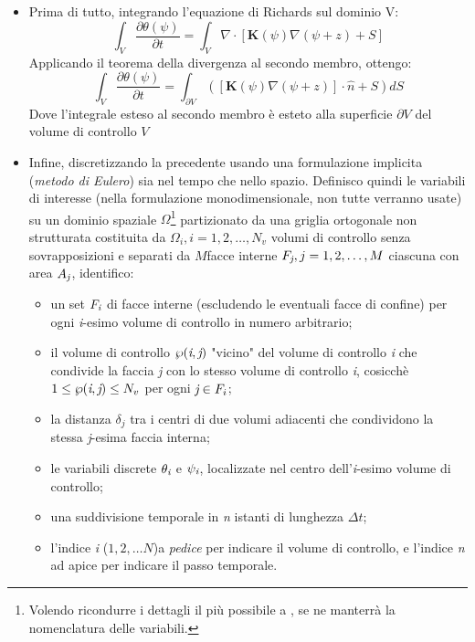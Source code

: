 \documentclass[11pt]{amsart}
\theoremstyle{definition}
\theoremstyle{remark}
\numberwithin{equation}{section}
\begin{document}
\begin{itemize}
  \item Prima di tutto, integrando l'equazione di Richards sul dominio V:
  \begin{equation}
  \int_{V}\frac{\partial \theta(\psi)}{\partial t} = \int_{V}\nabla\cdot[\textbf{K}(\psi)\nabla(\psi+z) + S]
  \end{equation}
  Applicando il teorema della divergenza al secondo membro, ottengo:
  \begin{equation}
  \int_{V}\frac{\partial \theta(\psi)}{\partial t} = \int_{\partial V}([\textbf{K}(\psi)\nabla(\psi+z)]\cdot \hat{n} + S)dS
  \end{equation}
  Dove l'integrale esteso al secondo membro è esteto alla superficie $\partial V$ del volume di controllo $V$
  \item Infine, discretizzando la precedente usando una formulazione implicita (\emph{metodo di Eulero}) sia nel tempo che nello spazio. Definisco quindi le variabili di interesse (nella formulazione monodimensionale, non tutte verranno usate) su un dominio spaziale $\Omega$\footnote{Volendo ricondurre i dettagli il più possibile a \cite{art:casulli}, se ne manterrà la nomenclatura delle variabili.} partizionato da una griglia ortogonale non strutturata costituita da $\Omega_i, i=1,2,\dots,N_{v}$ volumi di controllo senza sovrapposizioni e separati da $M$facce interne $F_{\emph{j}}, j = 1,2,\dots,M$ ciascuna con area $A_{\emph{j}}$, identifico:
    \begin{itemize}
    \item un set $F_{\emph{i}}$ di facce interne (escludendo le eventuali facce di confine) per ogni \emph{i}-esimo volume di controllo in numero arbitrario;
    \item il volume di controllo $\wp(\emph{i},\emph{j})$ "vicino" del volume di controllo \emph{i} che condivide la faccia \emph{j} con lo stesso volume di controllo \emph{i}, cosicchè $1\leq\wp(\emph{i},\emph{j})\leq N_{v}$ per ogni $\emph{j} \in F_{i}$;
    \item la distanza $\delta_{j}$ tra i centri di due volumi adiacenti che condividono la stessa \emph{j}-esima faccia interna;
    \item le variabili discrete $\theta_{\emph{i}}$ e $\psi_{\emph{i}}$, localizzate nel centro dell'\emph{i}-esimo volume di controllo;
    \item una suddivisione temporale in \emph{n} istanti di lunghezza $\Delta t$;
    \item l'indice \emph{i} ($1,2,\dots N$)a \emph{pedice} per indicare il volume di controllo, e l'indice \emph{n} ad apice per indicare il passo temporale.
    \end{itemize}  
\end{itemize}
  
\end{document}
